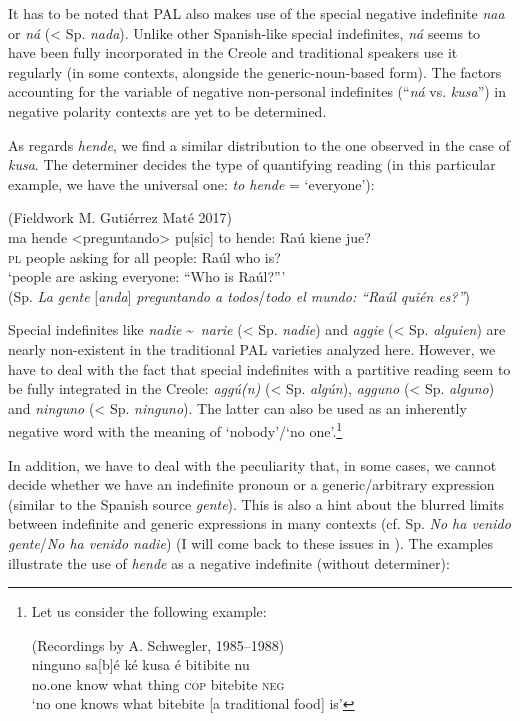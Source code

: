 \documentclass[output=paper,colorlinks,citecolor=brown]{langscibook}
\begin{document}
It has to be noted that PAL also makes use of the special negative indefinite \textit{naa} or \textit{ná} (< Sp. \textit{nada}). Unlike other Spanish-like special indefinites, \textit{ná} seems to have been fully incorporated in the Creole \citep[234]{Schwegler2016b} and traditional speakers use it regularly (in some contexts, alongside the generic\hyp noun\hyp based form). The factors accounting for the variable of negative non\hyp personal indefinites (“\textit{ná} vs. \textit{kusa}”) in negative polarity contexts are yet to be determined.  

As regards \textit{hende}, we find a similar distribution to the one observed in the case of \textit{kusa}. The determiner decides the type of quantifying reading (in this particular example, we have the universal one: \textit{to hende} = ‘everyone’):

\ea\label{ex:gut9}(Fieldwork M. Gutiérrez Maté 2017)\\
\gll ma hende <preguntando> pu[sic] to hende: Raú kiene jue? \\
\textsc{pl} people asking for all people: Raúl who is? \\
\glt ‘people are asking everyone: “Who is Raúl?”’ \\
(Sp. \textit{La gente }[\textit{anda}] \textit{preguntando a todos}/\textit{todo el mundo: “Raúl quién es?”})
\z

Special indefinites like \textit{nadie} \textasciitilde\ \textit{narie} (< Sp. \textit{nadie}) and \textit{aggie} (< Sp. \textit{alguien}) are nearly non-existent in the traditional PAL varieties analyzed here. However, we have to deal with the fact that special indefinites with a partitive reading seem to be fully integrated in the Creole: \textit{aggú(n)} (< Sp. \textit{algún}), \textit{agguno} (< Sp. \textit{alguno}) and \textit{ninguno} (< Sp. \textit{ninguno}). The latter can also be used as an inherently negative word with the meaning of ‘nobody’\slash ‘no one’.\footnote{Let us consider the following example: 

\ea (Recordings by A. Schwegler, 1985--1988)\\
\gll ninguno sa[b]é ké kusa é bitibite nu \\
 no.one know what thing \textsc{cop} bitebite \textsc{neg} \\
\glt ‘no one knows what bitebite [a traditional food] is’
\z}

In addition, we have to deal with the peculiarity that, in some cases, we cannot decide whether we have an indefinite pronoun or a generic/arbitrary expression (similar to the Spanish source \textit{gente}). This is also a hint about the blurred limits between indefinite and generic expressions in many contexts (cf. Sp. \textit{No ha venido gente}\slash \textit{No ha venido nadie}) (I will come back to these issues in ). The examples illustrate the use of \textit{hende} as a negative indefinite (without determiner): 
\end{document}
